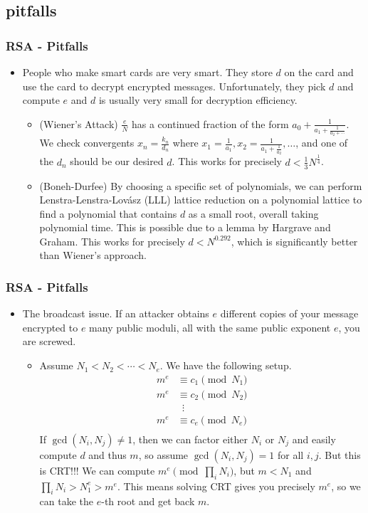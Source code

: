 \documentclass[aspectratio=169,t]{beamer}
\begin{document}
\subsection{pitfalls}
\begin{frame}
\frametitle{RSA - Pitfalls}
\begin{itemize}
\item
People who make smart cards are very smart. They store $d$ on the card and use
the card to decrypt encrypted messages. Unfortunately, they pick $d$ and compute
$e$ and $d$ is usually very small for decryption efficiency. \pause
\begin{itemize}
\item
(Wiener's Attack) $\frac{e}{N}$ has a continued fraction of the form $a_0 +
\frac{1}{a_1 + \frac{1}{a_2 + \cdots}}$. We check convergents $x_n =
\frac{k_n}{d_n}$ where $x_1 = \frac{1}{a_1}, x_2 = \frac{1}{a_1 +
\frac{1}{a_2}}, \dots$, and one of the $d_n$ should be our desired $d$. This
works for precisely $d < \frac{1}{3} N^{\frac{1}{4}}$. \pause
\item
(Boneh-Durfee) By choosing a specific set of polynomials, we can perform
Lenstra-Lenstra-Lov\'{a}sz (LLL) lattice reduction on a polynomial lattice to
find a polynomial that contains $d$ as a small root, overall taking polynomial
time. This is possible due to a lemma by Hargrave and Graham. This works for
precisely $d < N^{0.292}$, which is significantly better than Wiener's approach.
\end{itemize}
\end{itemize}
\end{frame}

\begin{frame}
\frametitle{RSA - Pitfalls}
\begin{itemize}
\item
The broadcast issue. If an attacker obtains $e$ different copies of your message
encrypted to $e$ many public moduli, all with the same public exponent $e$, you
are screwed. \pause
\begin{itemize}
\item
Assume $N_1 < N_2 < \cdots < N_e$. We have the following setup.
\[ \begin{aligned}
m^e &\equiv c_1 \pmod{N_1} \\
m^e &\equiv c_2 \pmod{N_2} \\
&\,\,\,\vdots \\
m^e &\equiv c_e \pmod{N_e} \\
\end{aligned} \] \pause
If $\gcd(N_i, N_j) \neq 1$, then we can factor either $N_i$ or $N_j$ and easily
compute $d$ and thus $m$, so assume $\gcd(N_i, N_j) = 1$ for all $i, j$. But
this is CRT!!! We can compute $m^e \pmod{\prod_i N_i}$, but $m < N_1$ and
$\prod_i N_i > N_1^e > m^e$. This means solving CRT gives you precisely $m^e$,
so we can take the $e$-th root and get back $m$.
\end{itemize}
\end{itemize}
\end{frame}
\end{document}
